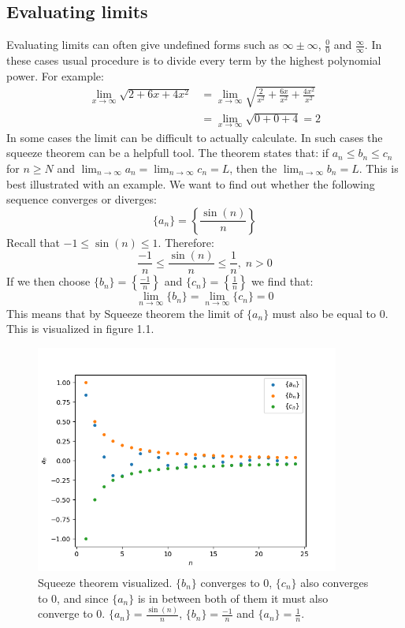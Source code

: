 \documentclass[11pt, a4paper]{article}
\begin{document}
\subsection{Evaluating limits}
Evaluating limits can often give undefined forms such as $\infty \pm \infty$, $\frac{0}{0}$ and $\frac{\infty}{\infty}$. In these cases usual procedure is to divide every term by the highest polynomial power. For example:
\begin{align*}
  \lim_{x\to\infty} \sqrt{2 + 6x + 4x^2} &= \lim_{x \to \infty} \sqrt{\frac{2}{x^2} + \frac{6x}{x^2} + \frac{4x^2}{x^2}}\\
  &= \lim_{x\to\infty} \sqrt{0 + 0 + 4} = 2
\end{align*}
In some cases the limit can be difficult to actually calculate. In such cases the squeeze theorem can be a helpfull tool. The theorem states that: if $a_n \leq b_n \leq c_n$ for $n \geq N$ and $\lim_{n\to \infty} a_n = \lim_{n\to \infty} c_n = L$, then the $\lim_{n\to \infty} b_n = L$. This is best illustrated with an example.
We want to find out whether the following sequence converges or diverges:
\begin{equation*}
  \{a_n\} = \left\{ \frac{\sin(n)}{n} \right\}
\end{equation*}
Recall that $-1 \leq \sin(n) \leq 1$. Therefore:
\begin{equation*}
  \frac{-1}{n} \leq \frac{\sin(n)}{n} \leq \frac{1}{n}, \; n>0
\end{equation*} 
If we then choose $\{ b_n\} = \left\{ \frac{-1}{n} \right\}$ and  $\{ c_n\} = \left\{ \frac{1}{n} \right\}$ we find that:
\begin{equation*}
  \lim_{n\to\infty} \{b_n\} = \lim_{n\to\infty} \{c_n\} = 0
\end{equation*}
This means that by Squeeze theorem the limit of $\{a_n\}$ must also be equal to 0. This is visualized in figure 1.1.
\begin{figure}[h]
  \centerline{\includegraphics[width=100mm]{images/Squeeze_Theorem.png}}
  \caption{Squeeze theorem visualized. $\{ b_n\}$ converges to $0$, $\{ c_n\}$ also converges to $0$, and since $\{ a_n\}$ is in between both of them it must also converge to $0$. $\{ a_n\} = \frac{\sin(n)}{n}$, $\{ b_n\} = \frac{-1}{n}$ and $\{ a_n\} = \frac{1}{n}$.}
\end{figure}
\end{document}

